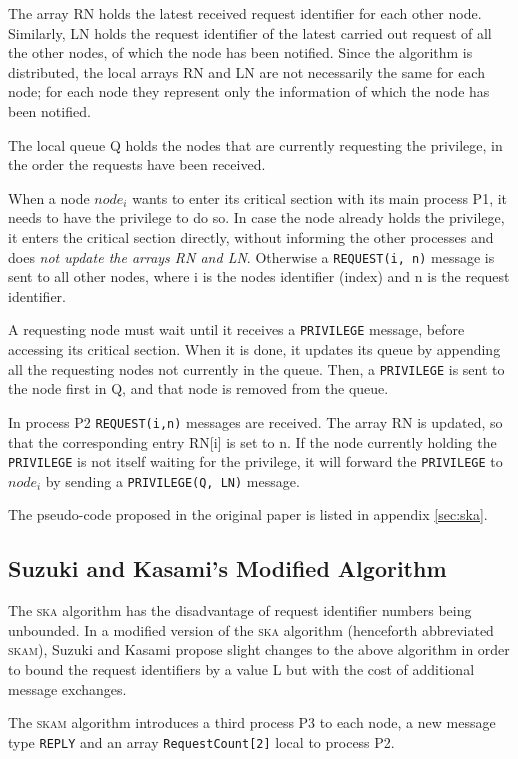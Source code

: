 \documentclass[a4paper,10pt]{llncs}
\begin{document}
The array RN holds the latest received request identifier for each other node. Similarly, LN holds the request identifier of the latest carried out request of all the other nodes, of which the node has been notified. Since the algorithm is distributed, the local arrays RN and LN are not necessarily the same for each node; for each node they represent only the information of which the node has been notified.

The local queue Q holds the nodes that are currently requesting the privilege, in the order the requests have been received.

When a node $node_i$ wants to enter its critical section with its main process P1, it needs to have the privilege to do so. In case the node already holds the privilege, it enters the critical section directly, without informing the other processes and does \emph{not update the arrays RN and LN}. Otherwise a \texttt{REQUEST(i, n)} message is sent to all other nodes, where i is the nodes identifier (index) and n is the request identifier.

A requesting node must wait until it receives a \texttt{PRIVILEGE} message, before accessing its critical section. When it is done, it updates its queue by appending all the requesting nodes not currently in the queue. Then, a \texttt{PRIVILEGE} is sent to the node first in Q, and that node is removed from the queue.

In process P2 \texttt{REQUEST(i,n)} messages are received. The array RN is updated, so that the corresponding entry RN[i] is set to n. If the node currently holding the \texttt{PRIVILEGE} is not itself waiting for the privilege, it will forward the \texttt{PRIVILEGE} to $node_i$ by sending a \texttt{PRIVILEGE(Q, LN)} message.

The pseudo-code proposed in the original paper is listed in appendix \ref{sec:ska}.

\subsection{Suzuki and Kasami's Modified Algorithm}
The \textsc{ska} algorithm has the disadvantage of request identifier numbers being unbounded. In a modified version of the \textsc{ska} algorithm (henceforth abbreviated \textsc{skam}), Suzuki and Kasami propose slight changes to the above algorithm in order to bound the request identifiers by a value L but with the cost of additional message exchanges.

The \textsc{skam} algorithm introduces a third process P3 to each node, a new message type \texttt{REPLY} and an array \texttt{RequestCount[2]} local to process P2.
\end{document}
